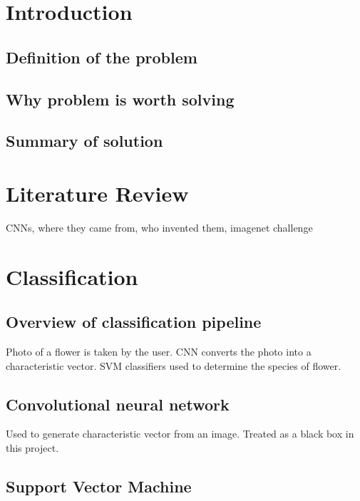 \documentclass[11pt, a4paper]{report}
\begin{document}
\chapter{Introduction}

\section{Definition of the problem} 

\section{Why problem is worth solving}

\section{Summary of solution}







\chapter{Literature Review}

CNNs, where they came from, who invented them, imagenet challenge





\chapter{Classification}

\section{Overview of classification pipeline}
Photo of a flower is taken by the user. CNN converts the photo into a characteristic vector. SVM classifiers used to determine the species of flower. 

\section{Convolutional neural network}
Used to generate characteristic vector from an image. Treated as a black box in this project.

\section{Support Vector Machine}
\end{document}
